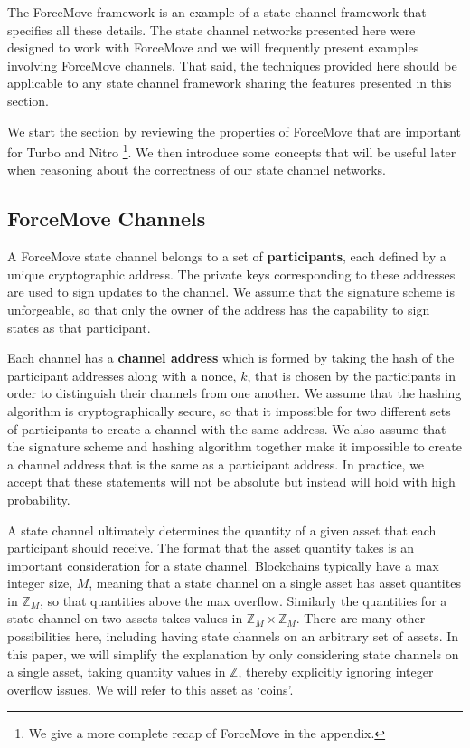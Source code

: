 \documentclass{article}
\theoremstyle{definition}
\begin{document}
The ForceMove framework is an example of a state channel framework that specifies all these details. 
The state channel networks presented here were designed to work with ForceMove and we will frequently present examples involving ForceMove channels.
That said, the techniques provided here should be applicable to any state channel framework sharing the features presented in this section.

We start the section by reviewing the properties of ForceMove that are important for Turbo and Nitro \footnote{We give a more complete recap of ForceMove in the appendix.}. 
We then introduce some concepts that will be useful later when reasoning about the correctness of our state channel networks. 

\subsection{ForceMove Channels}

A ForceMove state channel belongs to a set of \textbf{participants}, each defined by a unique cryptographic address.
The private keys corresponding to these addresses are used to sign updates to the channel.
We assume that the signature scheme is unforgeable, so that only the owner of the address has the capability to sign states as that participant.

Each channel has a \textbf{channel address} which is formed by taking the hash of the participant addresses along with a nonce, $k$, that is chosen by the participants in order to distinguish their channels from one another.
We assume that the hashing algorithm is cryptographically secure, so that it impossible for two different sets of participants to create a channel with the same address.
We also assume that the signature scheme and hashing algorithm together make it impossible to create a channel address that is the same as a participant address.
In practice, we accept that these statements will not be absolute but instead will hold with high probability.

A state channel ultimately determines the quantity of a given asset that each participant should receive.
The format that the asset quantity takes is an important consideration for a state channel.
Blockchains typically have a max integer size, $M$, meaning that a state channel on a single asset
has asset quantites in $\mathbb{Z}_M$, so that quantities above the max overflow.
Similarly the quantities for a state channel on two assets takes values in $\mathbb{Z}_M \times \mathbb{Z}_M$.
There are many other possibilities here, including having state channels on an arbitrary set of assets.
In this paper, we will simplify the explanation by only considering state channels on a single
asset, taking quantity values in $\mathbb{Z}$, thereby explicitly ignoring integer overflow issues.
We will refer to this asset as `coins'.
\end{document}
